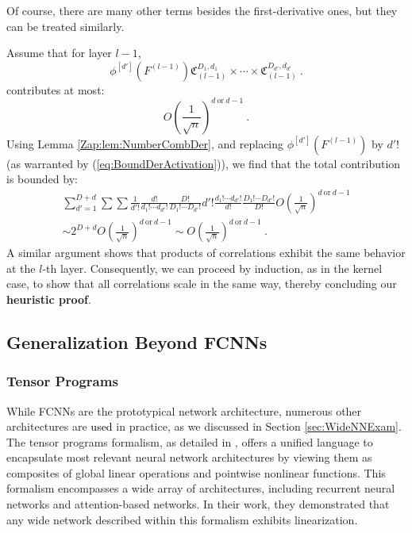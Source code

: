 \documentclass{article} %
\begin{document}
Of course, there are many other terms besides the first-derivative ones, but they can be treated similarly.

Assume that for layer \(l-1\),
\begin{equation}
\phi^{\left[d'\right]}\left(F^{(l-1)}\right)\mathfrak{C}_{\left(l-1\right)}^{D_{1},d_{1}}\times\cdots\times\mathfrak{C}_{\left(l-1\right)}^{D_{d'},d_{d'}} \ .
\end{equation}
contributes at most:
\begin{equation}
O\left(\frac{1}{\sqrt{n}}\right)^{d\ \text{or}\ d-1} \ .
\end{equation}
Using Lemma \ref{Zap:lem:NumberCombDer}, and replacing \(\phi^{\left[d'\right]}\left(F^{(l-1)}\right)\) by \(d'!\) (as warranted by (\ref{eq:BoundDerActivation})), we find that the total contribution is bounded by:
\begin{equation}
\begin{array}{c}
\sum_{d'=1}^{D+d}\sum\sum\frac{1}{d'!}\frac{d!}{d_{1}!\cdots d_{d'}!}\frac{D!}{D_{1}!\cdots D_{d'}!}d'!\frac{d_{1}!\cdots d_{d'}!}{d!}\frac{D_{1}!\cdots D_{d'}!}{D!}O\left(\frac{1}{\sqrt{n}}\right)^{d\ \text{or}\ d-1}\\
\sim2^{D+d}O\left(\frac{1}{\sqrt{n}}\right)^{d\ \text{or}\ d-1}\sim O\left(\frac{1}{\sqrt{n}}\right)^{d\ \text{or}\ d-1} \ .
\end{array}
\end{equation}
A similar argument shows that products of correlations exhibit the same behavior at the \(l\)-th layer. Consequently, we can proceed by induction, as in the kernel case, to show that all correlations scale in the same way, thereby concluding our \textbf{heuristic proof}.

\subsection{Generalization Beyond FCNNs}
\label{zap:sec:Genralisation}

\subsubsection{Tensor Programs}
\label{zap:sec:TenProg}

While FCNNs are the prototypical network architecture, numerous other architectures are \textcolor{black}{used} in practice, as we discussed in Section \ref{sec:WideNNExam}. The tensor programs formalism, as detailed in \cite{TensorProgramsiib2021}, offers a unified language to encapsulate most relevant neural network architectures by viewing them as composites of global linear operations and pointwise nonlinear functions. This formalism encompasses a wide array of architectures, including recurrent neural networks and attention-based networks. In their work, they demonstrated that any wide network described within this formalism exhibits linearization.
\end{document}
